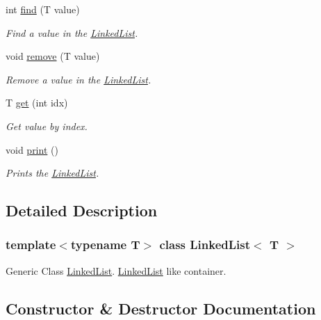 \begin{DoxyCompactItemize}
int \mbox{\hyperlink{class_linked_list_a23f2995817766b699c45a02d0040d741}{find}} (T value)
\begin{DoxyCompactList}\small\item\em Find a value in the \mbox{\hyperlink{class_linked_list}{Linked\+List}}. \end{DoxyCompactList}\item 
void \mbox{\hyperlink{class_linked_list_ad9b63a24343b67236dcf119e66066c24}{remove}} (T value)
\begin{DoxyCompactList}\small\item\em Remove a value in the \mbox{\hyperlink{class_linked_list}{Linked\+List}}. \end{DoxyCompactList}\item 
T \mbox{\hyperlink{class_linked_list_a5ca21e769005d1b3af2a2d2bb3313c98}{get}} (int idx)
\begin{DoxyCompactList}\small\item\em Get value by index. \end{DoxyCompactList}\item 
void \mbox{\hyperlink{class_linked_list_a9675767b81fb9f1d8799444e4ee7f43b}{print}} ()
\begin{DoxyCompactList}\small\item\em Prints the \mbox{\hyperlink{class_linked_list}{Linked\+List}}. \end{DoxyCompactList}\end{DoxyCompactItemize}


\subsection{Detailed Description}
\subsubsection*{template$<$typename T$>$\newline
class Linked\+List$<$ T $>$}

Generic Class \mbox{\hyperlink{class_linked_list}{Linked\+List}}. \mbox{\hyperlink{class_linked_list}{Linked\+List}} like container. 

\subsection{Constructor \& Destructor Documentation}
\mbox{\label{class_linked_list_a3c20fcfec867e867f541061a09fc640c}} 
